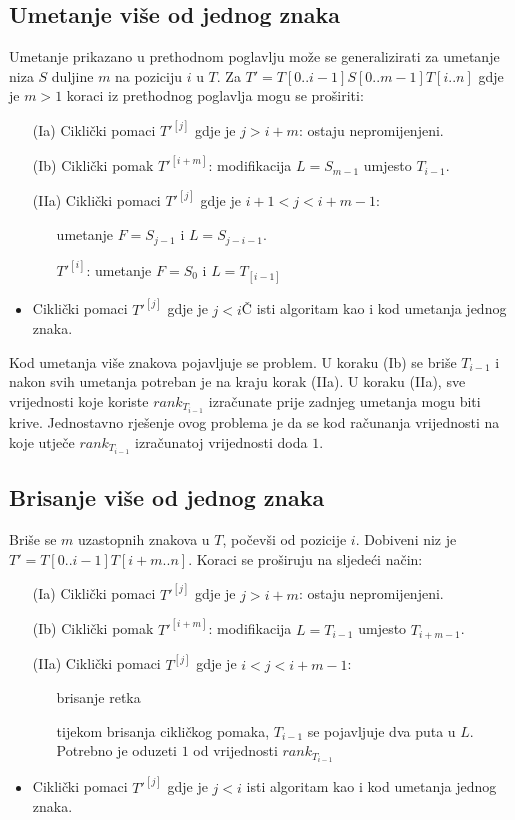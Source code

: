 \documentclass{ferseminar}
\begin{document}
\subsection{Umetanje više od jednog znaka}
Umetanje prikazano u prethodnom poglavlju može se generalizirati za umetanje niza $S$ duljine $m$ na poziciju $i$ u $T$. Za $T'=T[0..i-1]S[0..m-1]T[i..n]$ gdje je $m>1$ koraci iz prethodnog poglavlja mogu se proširiti:
\begin{itemize}
	\item[(Ia)] Ciklički pomaci $T'^{[j]}$ gdje je $j>i+m$: ostaju nepromijenjeni.
	\item[(Ib)] Ciklički pomak $T'^{[i+m]}$: modifikacija $L=S_{m-1}$ umjesto $T_{i-1}$.
	\item[(IIa)] Ciklički pomaci $T'^{[j]}$ gdje je $i+1<j<i+m-1$:
	\begin{itemize}
		\item[] umetanje $F=S_{j-1}$ i $L=S_{j-i-1}$.
		\item[$T'^{[i]}$:] umetanje  $F=S_0$ i $L=T_{[i-1]}$
	\end{itemize}
	\item Ciklički pomaci $T'^{[j]}$ gdje je $j<i$Č isti algoritam kao i kod umetanja jednog znaka.
\end{itemize}
Kod umetanja više znakova pojavljuje se problem. U koraku (Ib) se briše $T_{i-1}$ i nakon svih umetanja potreban je na kraju korak (IIa). U koraku (IIa), sve vrijednosti koje koriste $rank_{T_{i-1}}$ izračunate prije zadnjeg umetanja mogu biti krive. Jednostavno rješenje ovog problema je da se kod računanja vrijednosti na koje utječe $rank_{T_{i-1}}$ izračunatoj vrijednosti doda $1$.
\subsection{Brisanje više od jednog znaka}
Briše se $m$ uzastopnih znakova u $T$, počevši od pozicije $i$. Dobiveni niz je $T'=T[0..i-1]T[i+m..n]$. Koraci se proširuju na sljedeći način:
\begin{itemize}
	\item[(Ia)] Ciklički pomaci $T'^{[j]}$ gdje je $j>i+m$: ostaju nepromijenjeni.
	\item[(Ib)] Ciklički pomak $T'^{[i+m]}$: modifikacija $L=T_{i-1}$ umjesto $T_{i+m-1}$.
	\item[(IIa)] Ciklički pomaci $T^{[j]}$ gdje je $i<j<i+m-1$:
	\begin{itemize}
		\item[] brisanje retka
		\item[] tijekom brisanja cikličkog pomaka, $T_{i-1}$ se pojavljuje dva puta u $L$. Potrebno je oduzeti $1$ od vrijednosti $rank_{T_{i-1}}$
	\end{itemize}
	\item Ciklički pomaci $T'^{[j]}$ gdje je $j<i$ isti algoritam kao i kod umetanja jednog znaka.
\end{itemize}
\end{document}
